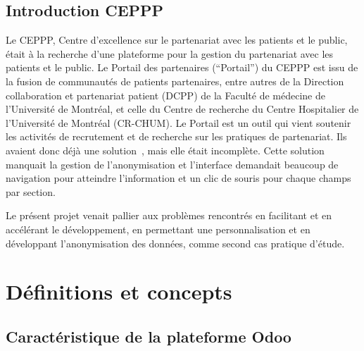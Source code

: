\subsection{Introduction CEPPP}




Le CEPPP, Centre d’excellence sur le partenariat avec les patients et le public, était à la recherche d'une plateforme pour la gestion du partenariat avec les patients et le public. Le Portail des partenaires (“Portail”) du CEPPP est issu de la fusion de communautés de patients partenaires, entre autres de la Direction collaboration et partenariat patient (DCPP) de la Faculté de médecine de l’Université de Montréal, et celle du Centre de recherche du Centre Hospitalier de l’Université de Montréal (CR-CHUM). Le Portail est un outil qui vient soutenir les activités de recrutement et de recherche sur les pratiques de partenariat. Ils avaient donc déjà une solution~\cite{github_ceppp_crm}, mais elle était incomplète. Cette solution manquait la gestion de l'anonymisation et l'interface demandait beaucoup de navigation pour atteindre l'information et un clic de souris pour chaque champs par section.

Le présent projet venait pallier aux problèmes rencontrés en facilitant et en accélérant le développement, en permettant une personnalisation et en développant l'anonymisation des données, comme second cas pratique d'étude.





\section{Définitions et concepts}


\subsection{Caractéristique de la plateforme Odoo}

